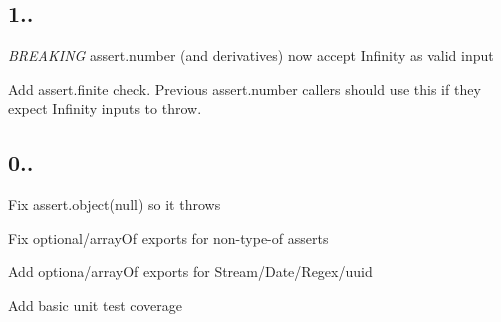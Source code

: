 \subsection*{1..}


\begin{DoxyItemize}
\item {\itshape B\+R\+E\+A\+K\+I\+NG} assert.\+number (and derivatives) now accept Infinity as valid input
\item Add assert.\+finite check. Previous assert.\+number callers should use this if they expect Infinity inputs to throw.
\end{DoxyItemize}

\subsection*{0..}


\begin{DoxyItemize}
\item Fix {\ttfamily assert.\+object(null)} so it throws
\item Fix optional/array\+Of exports for non-\/type-\/of asserts
\item Add optiona/array\+Of exports for Stream/\+Date/\+Regex/uuid
\item Add basic unit test coverage 
\end{DoxyItemize}
